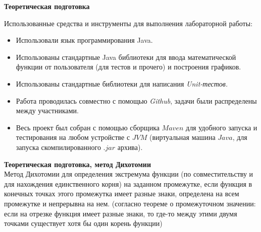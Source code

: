 \textbf{Теоретическая подготовка}
\vspace{0.5cm}

Использованные средства и инструменты для выполнения лабораторной работы:
\begin{itemize}
    \item Использовали язык программирования Java.
    \item Использованы стандартные Java библиотеки для ввода математической функции от пользователя (для тестов и прочего) и построения графиков.
    \item Использованы стандартные библиотеки для написания \textit{Unit-тестов.}
    \item Работа проводилась совместно с помощью \textit{Github}, задачи были распределены между участниками.
    \item Весь проект был собран с помощью сборщика $Maven$ для удобного запуска и тестирования на любом устройстве с $JVM$ (виртуальная машина $Java$, для запуска скомпилированного $.jar$ архива).
\end{itemize}
\vspace{1cm}

\textbf{Теоретическая подготовка, метод Дихотомии}\\

Метод Дихотомии для определения экстремума функции (по совместительству и для нахождения единственного корня)
на заданном промежутке, если функция в конечных точках этого промежутка имеет разные знаки, определена на всем промежутке и непрерывна 
на нем. (согласно теореме о промежуточном значении: если на отрезке функция имеет разные знаки, то где-то между
этими двумя точками существует хотя бы один корень функции)\\

